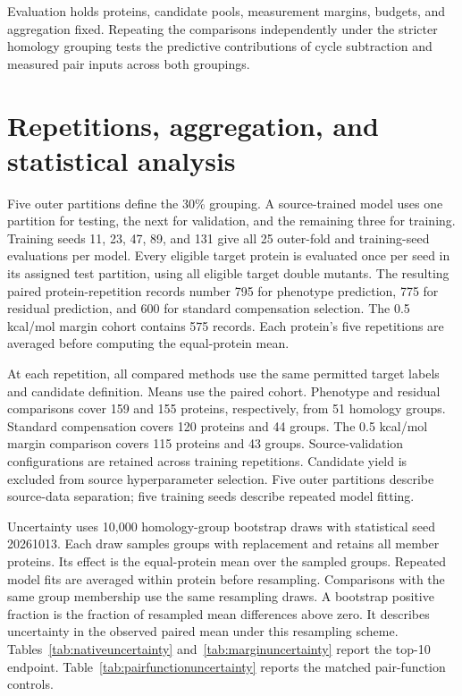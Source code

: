 \documentclass{llncs}
\begin{document}
Evaluation holds proteins, candidate pools, measurement margins, budgets, and aggregation fixed. Repeating the comparisons independently under the stricter homology grouping tests the predictive contributions of cycle subtraction and measured pair inputs across both groupings.

\section{Repetitions, aggregation, and statistical analysis}

Five outer partitions define the 30\% grouping. A source-trained model uses one partition for testing, the next for validation, and the remaining three for training. Training seeds 11, 23, 47, 89, and 131 give all 25 outer-fold and training-seed evaluations per model. Every eligible target protein is evaluated once per seed in its assigned test partition, using all eligible target double mutants. The resulting paired protein-repetition records number 795 for phenotype prediction, 775 for residual prediction, and 600 for standard compensation selection. The 0.5 kcal/mol margin cohort contains 575 records. Each protein's five repetitions are averaged before computing the equal-protein mean.

At each repetition, all compared methods use the same permitted target labels and candidate definition. Means use the paired cohort. Phenotype and residual comparisons cover 159 and 155 proteins, respectively, from 51 homology groups. Standard compensation covers 120 proteins and 44 groups. The 0.5 kcal/mol margin comparison covers 115 proteins and 43 groups. Source-validation configurations are retained across training repetitions. Candidate yield is excluded from source hyperparameter selection. Five outer partitions describe source-data separation; five training seeds describe repeated model fitting.

Uncertainty uses 10,000 homology-group bootstrap draws with statistical seed 20261013. Each draw samples groups with replacement and retains all member proteins. Its effect is the equal-protein mean over the sampled groups. Repeated model fits are averaged within protein before resampling. Comparisons with the same group membership use the same resampling draws. A bootstrap positive fraction is the fraction of resampled mean differences above zero. It describes uncertainty in the observed paired mean under this resampling scheme. Tables~\ref{tab:nativeuncertainty} and~\ref{tab:marginuncertainty} report the top-10 endpoint. Table~\ref{tab:pairfunctionuncertainty} reports the matched pair-function controls.
\end{document}
